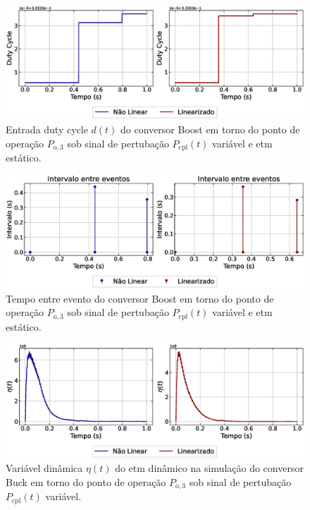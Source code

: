 \begin{figure}[H]
  \centering
  \captionsetup{justification=centering}
  \includegraphics[width=1.\textwidth]{figuras/dynamic-etm/boost/sim2/op1/duty-cycle.eps}
  \caption{Entrada duty cycle $d(t)$ do conversor Boost em torno do ponto de operação $P_{\mathrm{o}, 3}$ sob sinal de pertubação $P_{\mathrm{cpl}}(t)$ variável e \acrshort{etm} estático.}
\end{figure}

\begin{figure}[H]
  \centering
  \captionsetup{justification=centering}
  \includegraphics[width=1.\textwidth]{figuras/dynamic-etm/boost/sim2/op1/inter-event-times.eps}
  \caption{Tempo entre evento do conversor Boost em torno do ponto de operação $P_{\mathrm{o}, 3}$ sob sinal de pertubação $P_{\mathrm{cpl}}(t)$ variável e \acrshort{etm} estático.}
\end{figure}

\begin{figure}[H]
  \centering
  \captionsetup{justification=centering}
  \includegraphics[width=1.\textwidth]{figuras/dynamic-etm/boost/sim2/op1/eta.eps}
  \caption{Variável dinâmica $\eta(t)$ do \acrshort{etm} dinâmico na simulação do conversor Buck em torno do ponto de operação $P_{\mathrm{o}, 3}$ sob sinal de pertubação $P_{\mathrm{cpl}}(t)$ variável.}
\end{figure}

